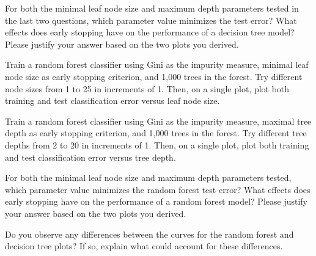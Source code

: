 \documentclass{article}
\begin{document}
\begin{solution}

\end{solution}

\problem[4]
For both the minimal leaf node size and maximum depth parameters tested in the last two questions, which parameter value minimizes the test error? What effects does early stopping have on the performance of a decision tree model?
Please justify your answer based on the two plots you derived.

\begin{solution}

\end{solution}

\indent\problem[2] %
Train a random forest classifier using Gini as the impurity measure, minimal leaf node size as early stopping criterion, and 1,000 trees in the forest. Try different node sizes from 1 to 25 in increments of 1. Then, on a single plot, plot both training and test classification error versus
leaf node size.

\begin{solution}

\end{solution}

\problem[2]
Train a random forest classifier using Gini as the impurity measure, maximal tree depth as early stopping criterion, and 1,000 trees in the forest. Try different tree depths from 2 to 20 in increments of 1. Then, on a single plot, plot both training and test classification error versus tree depth.

\begin{solution}

\end{solution}

\problem[4]
For both the minimal leaf node size and maximum depth parameters tested, which parameter value minimizes the random forest test error? What effects does early stopping have on the performance of a random forest model?
Please justify your answer based on the two plots you derived.

\begin{solution}

\end{solution}

\problem[4]
Do you observe any differences between the curves for the random forest and decision tree plots? If so, explain what could account for these differences.
\end{document}
